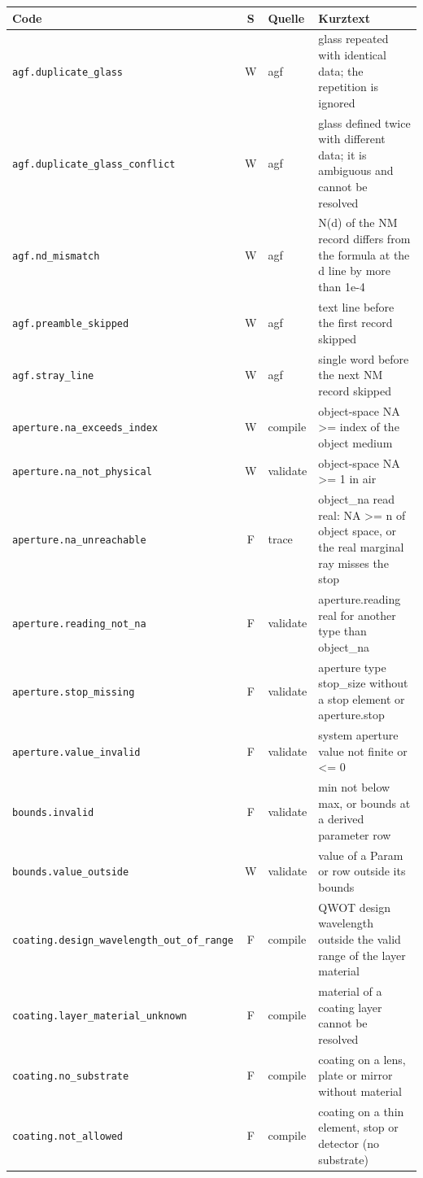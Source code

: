 \documentclass[11pt,a4paper,openany]{book}
\begin{document}
{\footnotesize
\begin{longtable}{@{}L{6.1cm}cL{1.3cm}L{6.9cm}@{}}
\toprule
Code & S & Quelle & Kurztext \\ \midrule \endhead
\texttt{agf.duplicate\_glass} & W & agf & glass repeated with identical data; the repetition is ignored \\
\texttt{agf.duplicate\_glass\_conflict} & W & agf & glass defined twice with different data; it is ambiguous and cannot be resolved \\
\texttt{agf.nd\_mismatch} & W & agf & N(d) of the NM record differs from the formula at the d line by more than 1e-4 \\
\texttt{agf.preamble\_skipped} & W & agf & text line before the first record skipped \\
\texttt{agf.stray\_line} & W & agf & single word before the next NM record skipped \\
\texttt{aperture.na\_exceeds\_index} & W & compile & object-space NA >= index of the object medium \\
\texttt{aperture.na\_not\_physical} & W & validate & object-space NA >= 1 in air \\
\texttt{aperture.na\_unreachable} & F & trace & object\_na read real: NA >= n of object space, or the real marginal ray misses the stop \\
\texttt{aperture.reading\_not\_na} & F & validate & aperture.reading real for another type than object\_na \\
\texttt{aperture.stop\_missing} & F & validate & aperture type stop\_size without a stop element or aperture.stop \\
\texttt{aperture.value\_invalid} & F & validate & system aperture value not finite or <= 0 \\
\texttt{bounds.invalid} & F & validate & min not below max, or bounds at a derived parameter row \\
\texttt{bounds.value\_outside} & W & validate & value of a Param or row outside its bounds \\
\texttt{coating.design\_wavelength\_out\_of\_range} & F & compile & QWOT design wavelength outside the valid range of the layer material \\
\texttt{coating.layer\_material\_unknown} & F & compile & material of a coating layer cannot be resolved \\
\texttt{coating.no\_substrate} & F & compile & coating on a lens, plate or mirror without material \\
\texttt{coating.not\_allowed} & F & compile & coating on a thin element, stop or detector (no substrate) \\

\end{longtable}}
\end{document}
